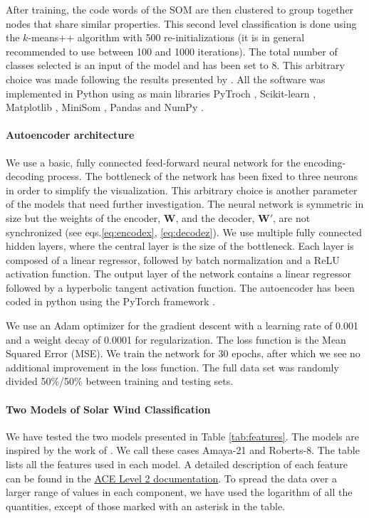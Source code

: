 \documentclass[utf8]{frontiersSCNS} %
\begin{document}
After training, the code words of the SOM are then clustered to group together nodes that share similar properties. This second level classification is done using the $k$-means++ algorithm with 500 re-initializations (it is in general recommended to use between 100 and 1000 iterations). The total number of classes selected is an input of the model and has been set to 8. This arbitrary choice was made following the results presented by \citep{Roberts2020}. All the software was implemented in Python using as main libraries PyTroch \citep{paszke2019pytorch}, Scikit-learn \citep{pedregosa2011scikit}, Matplotlib \citep{hunter2007matplotlib}, MiniSom \citep{vettigli2013minisom}, Pandas \citep{mckinney2010} and NumPy \citep{oliphant2006guide}.

\paragraph{Autoencoder architecture}
We use a basic, fully connected feed-forward neural network for the encoding-decoding process. The bottleneck of the network has been fixed to three neurons in order to simplify the visualization. This arbitrary choice is another parameter of the models that need further investigation. The neural network is symmetric in size but the weights of the encoder, $\boldsymbol{W}$, and the decoder, $\boldsymbol{W'}$, are not synchronized (see eqs.\eqref{eq:encodex}, \eqref{eq:decodez}). We use multiple fully connected hidden layers, where the central layer is the size of the bottleneck. Each layer is composed of a linear regressor, followed by batch normalization and a ReLU activation function. The output layer of the network contains a linear regressor followed by a hyperbolic tangent activation function. The autoencoder has been coded in python using the PyTorch framework \citep{paszke2019pytorch}.

We use an Adam optimizer \citep{Kingma2014} for the gradient descent with a learning rate of 0.001 and a weight decay of 0.0001 for regularization. The loss function is the Mean Squared Error (MSE). We train the network for 30 epochs, after which we see no additional improvement in the loss function. The full data set was randomly divided 50\%/50\% between training and testing sets.

\paragraph{Two Models of Solar Wind Classification}
\label{sec:fourmodels}
We have tested the two models presented in Table \ref{tab:features}. The models are inspired by the work of \citep{Roberts2020}. We call these cases Amaya-21 and Roberts-8.  The table lists all the features used in each model. A detailed description of each feature can be found in the \href{http://www.srl.caltech.edu/cgi-bin/dib/rundibviewmultil2/ACE/ASC/DATA/level2/multi}{ACE Level 2 documentation}. To spread the data over a larger range of values in each component, we have used the logarithm of all the quantities, except of those marked with an asterisk in the table.
\end{document}
